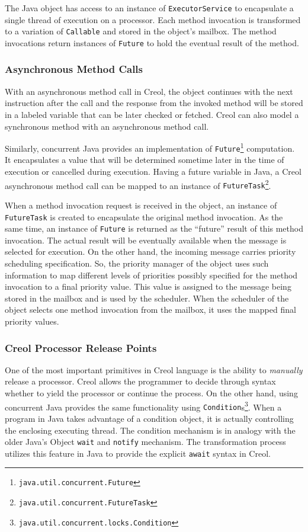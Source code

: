 The Java object has access to an instance of
{\footnotesize\texttt{ExecutorService}} to encapsulate a single thread of
execution on a processor. Each method invocation is transformed to a variation
of  {\footnotesize\texttt{Callable}} and stored in the object's mailbox. The
method invocations return instances of {\footnotesize\texttt{Future}} to hold
the eventual result of the method.

\subsubsection{Asynchronous Method Calls}
With an asynchronous method call in Creol, the object continues with the
next instruction after the call and the response from the invoked method will be
stored in a labeled variable that can be later checked or fetched. Creol can
also model a synchronous method with an asynchronous method call.
 
Similarly, concurrent Java provides an implementation of
{\footnotesize\texttt{Future}}\footnote{\texttt{java.util.concurrent.Future}}
computation. It encapsulates a value that will be determined sometime later in
the time of execution or cancelled during execution. Having a future variable in
Java, a Creol asynchronous method call can be mapped to an instance of
{\footnotesize\texttt{FutureTask}}\footnote{\texttt{java.util.concurrent.FutureTask}}.

When a method invocation request is received in the object, an instance of
{\footnotesize\texttt{FutureTask}} is created to encapsulate the original method
invocation. As the same time, an instance of {\footnotesize\texttt{Future}} is
returned as the ``future'' result of this method invocation. The actual result
will be eventually available when the message is selected for execution. On the
other hand, the incoming message carries priority scheduling specification. So,
the priority manager of the object uses such information to map different levels
of priorities possibly specified for the method invocation to a final priority
value. This value is assigned to the message being stored in the mailbox and is
used by the scheduler. When the scheduler of the object selects one method
invocation from the mailbox, it uses the mapped final priority values.

\subsubsection{Creol Processor Release Points}
One of the most important primitives in Creol language is the ability to
\textit{manually} release a processor. Creol allows the programmer to decide
through syntax whether to yield the processor or continue the process. On the
other hand, using concurrent Java provides the same functionality using
{\footnotesize\texttt{Condition}}s\footnote{\texttt{java.util.concurrent.locks.Condition}}.
When a program in Java takes advantage of a condition object, it is actually
controlling the enclosing executing thread. The condition mechanism is in
analogy with the older Java's Object {\footnotesize\texttt{wait}} and
{\footnotesize\texttt{notify}} mechanism. The transformation process utilizes
this feature in Java to provide the explicit {\footnotesize\texttt{await}}
syntax in Creol.


